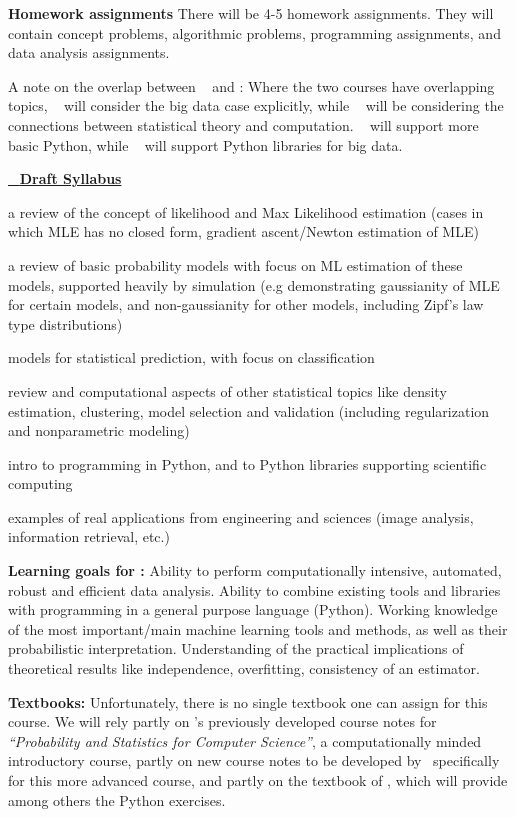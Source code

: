 {\bf Homework assignments} There will be 4-5 homework
assignments. They will contain concept problems, algorithmic problems,
programming assignments, and data analysis assignments.

A note on the overlap between \statcl~ and \astrocl: Where the two
courses have overlapping topics, \astrocl~ will consider the big data case
explicitly, while \statcl~ will be considering the connections between
statistical theory and computation. \statcl~ will support more basic
Python, while \astrocl~ will support Python libraries for big data.


\vskip 0.2in
\bit
\item  \underline{\statcl~ {\bf Draft Syllabus}}\\
\bit
\item a review of the concept of likelihood and Max Likelihood estimation (cases in which MLE has no closed form, gradient ascent/Newton estimation of MLE)
\item a review of basic probability models with focus on ML estimation of these models, supported heavily by simulation (e.g demonstrating gaussianity of MLE for certain models, and non-gaussianity for other models, including Zipf's law type distributions)
\item models for statistical prediction, with focus on classification
\item review and computational aspects of other statistical topics like
  density estimation, clustering, model selection and validation
  (including regularization and  nonparametric modeling)
\item intro to programming in Python, and to Python libraries supporting scientific computing
\item examples of real applications from engineering and sciences (image analysis, information retrieval, etc.)
\eit
\item[]{\bf Learning goals for \statcl:} Ability to perform computationally intensive, automated, robust and efficient data analysis. Ability to combine existing tools and libraries with programming in a general purpose language (Python). 
Working knowledge of the most important/main machine learning tools and methods, as well as their probabilistic interpretation. Understanding of the practical implications of theoretical results like independence, overfitting, consistency of an estimator. 

{\bf Textbooks:} Unfortunately, there is no single textbook one can
assign for this course. We will rely partly on \meila's previously
developed course notes for {\it ``Probability and Statistics for
  Computer Science''}, a computationally minded introductory course,
partly on new course notes to be developed by \meila\ specifically for
this more advanced course, and partly on the textbook of \astrocl,
which will provide among others the Python exercises. %

